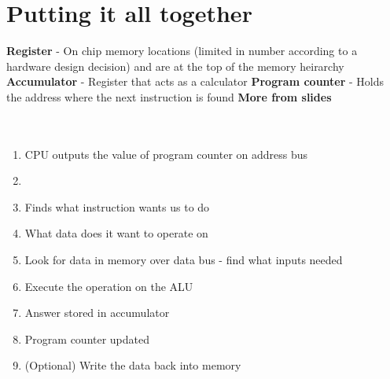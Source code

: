 \documentclass{article}[18pt]
\begin{document}
\section{Putting it all together}
\textbf{Register} - On chip memory locations (limited in number according to a hardware design decision) and are at the top of the memory heirarchy\\
\textbf{Accumulator} - Register that acts as a calculator
\textbf{Program counter} - Holds the address where the next instruction is found
\textbf{More from slides}\\
\\
\\
\begin{enumerate}
\item CPU outputs the value of program counter on address bus
\item 
\item Finds what instruction wants us to do
\item What data does it want to operate on
\item Look for data in memory over data bus - find what inputs needed
\item Execute the operation on the ALU
\item Answer stored in accumulator
\item Program counter updated
\item (Optional) Write the data back into memory
\end{enumerate}
\end{document}
